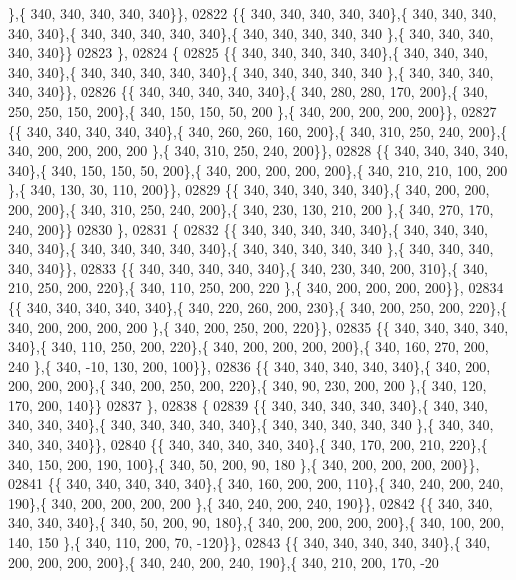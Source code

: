 \begin{DoxyCode}
      \},\{ 340, 340, 340, 340, 340\}\},
02822 \{\{ 340, 340, 340, 340, 340\},\{ 340, 340, 340, 340, 340\},\{ 340, 340, 340, 340, 340\},\{ 340, 340, 340, 340, 340
      \},\{ 340, 340, 340, 340, 340\}\}
02823 \},
02824 \{
02825 \{\{ 340, 340, 340, 340, 340\},\{ 340, 340, 340, 340, 340\},\{ 340, 340, 340, 340, 340\},\{ 340, 340, 340, 340, 340
      \},\{ 340, 340, 340, 340, 340\}\},
02826 \{\{ 340, 340, 340, 340, 340\},\{ 340, 280, 280, 170, 200\},\{ 340, 250, 250, 150, 200\},\{ 340, 150, 150,  50, 200
      \},\{ 340, 200, 200, 200, 200\}\},
02827 \{\{ 340, 340, 340, 340, 340\},\{ 340, 260, 260, 160, 200\},\{ 340, 310, 250, 240, 200\},\{ 340, 200, 200, 200, 200
      \},\{ 340, 310, 250, 240, 200\}\},
02828 \{\{ 340, 340, 340, 340, 340\},\{ 340, 150, 150,  50, 200\},\{ 340, 200, 200, 200, 200\},\{ 340, 210, 210, 100, 200
      \},\{ 340, 130,  30, 110, 200\}\},
02829 \{\{ 340, 340, 340, 340, 340\},\{ 340, 200, 200, 200, 200\},\{ 340, 310, 250, 240, 200\},\{ 340, 230, 130, 210, 200
      \},\{ 340, 270, 170, 240, 200\}\}
02830 \},
02831 \{
02832 \{\{ 340, 340, 340, 340, 340\},\{ 340, 340, 340, 340, 340\},\{ 340, 340, 340, 340, 340\},\{ 340, 340, 340, 340, 340
      \},\{ 340, 340, 340, 340, 340\}\},
02833 \{\{ 340, 340, 340, 340, 340\},\{ 340, 230, 340, 200, 310\},\{ 340, 210, 250, 200, 220\},\{ 340, 110, 250, 200, 220
      \},\{ 340, 200, 200, 200, 200\}\},
02834 \{\{ 340, 340, 340, 340, 340\},\{ 340, 220, 260, 200, 230\},\{ 340, 200, 250, 200, 220\},\{ 340, 200, 200, 200, 200
      \},\{ 340, 200, 250, 200, 220\}\},
02835 \{\{ 340, 340, 340, 340, 340\},\{ 340, 110, 250, 200, 220\},\{ 340, 200, 200, 200, 200\},\{ 340, 160, 270, 200, 240
      \},\{ 340, -10, 130, 200, 100\}\},
02836 \{\{ 340, 340, 340, 340, 340\},\{ 340, 200, 200, 200, 200\},\{ 340, 200, 250, 200, 220\},\{ 340,  90, 230, 200, 200
      \},\{ 340, 120, 170, 200, 140\}\}
02837 \},
02838 \{
02839 \{\{ 340, 340, 340, 340, 340\},\{ 340, 340, 340, 340, 340\},\{ 340, 340, 340, 340, 340\},\{ 340, 340, 340, 340, 340
      \},\{ 340, 340, 340, 340, 340\}\},
02840 \{\{ 340, 340, 340, 340, 340\},\{ 340, 170, 200, 210, 220\},\{ 340, 150, 200, 190, 100\},\{ 340,  50, 200,  90, 180
      \},\{ 340, 200, 200, 200, 200\}\},
02841 \{\{ 340, 340, 340, 340, 340\},\{ 340, 160, 200, 200, 110\},\{ 340, 240, 200, 240, 190\},\{ 340, 200, 200, 200, 200
      \},\{ 340, 240, 200, 240, 190\}\},
02842 \{\{ 340, 340, 340, 340, 340\},\{ 340,  50, 200,  90, 180\},\{ 340, 200, 200, 200, 200\},\{ 340, 100, 200, 140, 150
      \},\{ 340, 110, 200,  70, -120\}\},
02843 \{\{ 340, 340, 340, 340, 340\},\{ 340, 200, 200, 200, 200\},\{ 340, 240, 200, 240, 190\},\{ 340, 210, 200, 170, -20

\end{DoxyCode}
